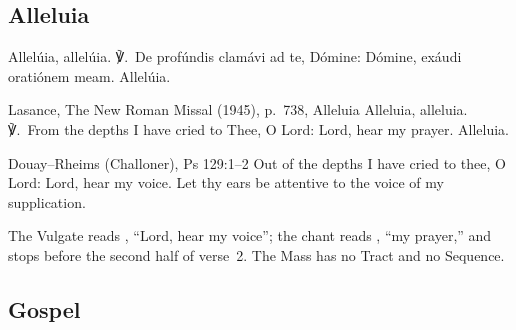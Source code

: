 \subsection{Alleluia}
\label{proper-alleluia}


\begin{latinproper}
Allelúia, allelúia. ℣.~De profúndis clamávi ad te, Dómine: Dómine, exáudi
oratiónem meam. Allelúia.
\end{latinproper}

\begin{englishwitness}{Lasance, The New Roman Missal (1945), p.~738, Alleluia}
Alleluia, alleluia. ℣.~From the depths I have cried to Thee, O Lord: Lord,
hear my prayer. Alleluia.
\end{englishwitness}

\begin{englishwitness}{Douay--Rheims (Challoner), Ps 129:1--2}
Out of the depths I have cried to thee, O Lord: Lord, hear my voice. Let thy
ears be attentive to the voice of my supplication.
\end{englishwitness}

\noindent The Vulgate reads , ``Lord, hear my
voice''; the chant reads , ``my prayer,'' and stops
before the second half of verse~2. The Mass has no Tract and no Sequence.

\subsection{Gospel}
\label{proper-gospel}


